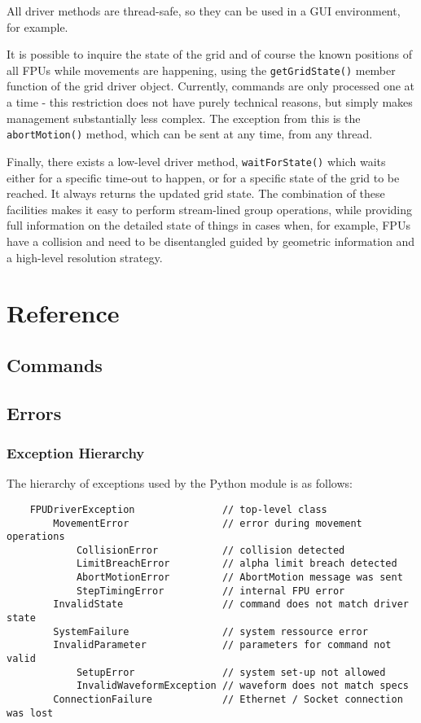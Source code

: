 \documentclass{scrartcl}[12pt,a4paper]
\begin{document}
All driver methods are thread-safe, so they can be used in a GUI
environment, for example.

It is possible to inquire the state of the grid and of course the
known positions of all FPUs while movements are happening, using the
\texttt{getGridState()} member function of the grid driver
object. Currently, commands are only processed one at a time - this
restriction does not have purely technical reasons, but simply makes
management substantially less complex. The exception from this is the
\texttt{abortMotion()} method, which can be sent at any time, from any
thread.

Finally, there exists a low-level driver method,
\texttt{waitForState()} which waits either for a specific time-out to
happen, or for a specific state of the grid to be reached. It always
returns the updated grid state. The combination of these facilities
makes it easy to perform stream-lined group operations, while
providing full information on the detailed state of things in cases
when, for example, FPUs have a collision and need to be disentangled
guided by geometric information and a high-level resolution strategy.



\section{Reference}
\subsection{Commands}
\label{sec:commands}
 
\subsection{Errors}
\label{sec:errors}

\subsubsection{Exception Hierarchy}

The hierarchy of exceptions used by the Python module is as follows:

\begin{verbatim}
    FPUDriverException               // top-level class
        MovementError                // error during movement operations
            CollisionError           // collision detected
            LimitBreachError         // alpha limit breach detected
            AbortMotionError         // AbortMotion message was sent
            StepTimingError          // internal FPU error
        InvalidState                 // command does not match driver state
        SystemFailure                // system ressource error
        InvalidParameter             // parameters for command not valid
            SetupError               // system set-up not allowed
            InvalidWaveformException // waveform does not match specs
        ConnectionFailure            // Ethernet / Socket connection was lost
\end{verbatim}
\end{document}
